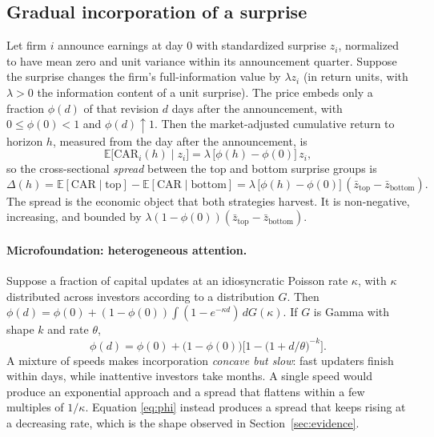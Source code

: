 \documentclass[11pt]{article}
\theoremstyle{definition}
\newcommand{\E}{\mathbb{E}}
\newcommand{\1}{\mathbf{1}}
\begin{document}
\subsection{Gradual incorporation of a surprise}

Let firm $i$ announce earnings at day $0$ with standardized surprise $z_i$, normalized to
have mean zero and unit variance within its announcement quarter. Suppose the surprise
changes the firm's full-information value by $\lambda z_i$ (in return units, with $\lambda>0$
the information content of a unit surprise). The price embeds only a fraction $\phi(d)$ of
that revision $d$ days after the announcement, with $0\le\phi(0)<1$ and $\phi(d)\uparrow1$.
Then the market-adjusted cumulative return to horizon $h$, measured from the day after the
announcement, is
\begin{equation}
  \E\big[\mathrm{CAR}_i(h)\mid z_i\big]=\lambda\,\big[\phi(h)-\phi(0)\big]\,z_i,
  \label{eq:drift}
\end{equation}
so the cross-sectional \emph{spread} between the top and bottom surprise groups is
\begin{equation}
  \Delta(h)=\E[\mathrm{CAR}\mid \text{top}]-\E[\mathrm{CAR}\mid\text{bottom}]
  =\lambda\,\big[\phi(h)-\phi(0)\big]\,(\bar z_{\text{top}}-\bar z_{\text{bottom}}).
  \label{eq:spread}
\end{equation}
The spread is the economic object that both strategies harvest. It is non-negative,
increasing, and bounded by $\lambda(1-\phi(0))(\bar z_{\text{top}}-\bar z_{\text{bottom}})$.

\paragraph{Microfoundation: heterogeneous attention.}
Suppose a fraction of capital updates at an idiosyncratic Poisson rate $\kappa$, with
$\kappa$ distributed across investors according to a distribution $G$. Then
$\phi(d)=\phi(0)+(1-\phi(0))\int(1-e^{-\kappa d})\,dG(\kappa)$. If $G$ is Gamma with shape $k$
and rate $\theta$,
\begin{equation}
  \phi(d)=\phi(0)+\big(1-\phi(0)\big)\Big[1-\big(1+d/\theta\big)^{-k}\Big].
  \label{eq:phi}
\end{equation}
A mixture of speeds makes incorporation \emph{concave but slow}: fast updaters finish within
days, while inattentive investors take months. A single speed would produce an exponential
approach and a spread that flattens within a few multiples of $1/\kappa$. Equation
\eqref{eq:phi} instead produces a spread that keeps rising at a decreasing rate, which is the
shape observed in Section~\ref{sec:evidence}.
\end{document}
